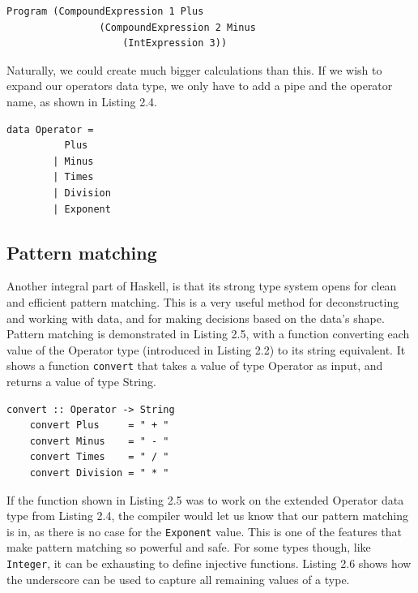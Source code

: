 \begin{lstlisting}[caption={An AST constructed with data types presented in Listing 2.2}, captionpos=b]
    Program (CompoundExpression 1 Plus
                (CompoundExpression 2 Minus
                    (IntExpression 3))
\end{lstlisting}

Naturally, we could create much bigger calculations than this. If we wish to expand our operators data type, we only have to add a pipe and the operator name, as shown in Listing 2.4. \hfill \\

\begin{lstlisting}[caption={An extended version of the Operator data type presented in Listing 2.2}, captionpos=b]
    data Operator =
          Plus
        | Minus
        | Times
        | Division
        | Exponent
\end{lstlisting}

\subsection{Pattern matching}

Another integral part of Haskell, is that its strong type system opens for clean and efficient pattern matching. This is a very useful method for deconstructing and working with data, and for making decisions based on the data's shape. \hfill \\

Pattern matching is demonstrated in Listing 2.5, with a function converting each value of the Operator type (introduced in Listing 2.2) to its string equivalent. It shows a function \texttt{convert} that takes a value of type Operator as input, and returns a value of type String. \hfill \\

\begin{lstlisting}[caption={Haskell function converting values of one type to another}, captionpos=b]
    convert :: Operator -> String
    convert Plus     = " + "
    convert Minus    = " - "
    convert Times    = " / "
    convert Division = " * "
\end{lstlisting}

If the function shown in Listing 2.5 was to work on the extended Operator data type from Listing 2.4, the compiler would let us know that our pattern matching is in, as there is no case for the \texttt{Exponent} value. This is one of the features that make pattern matching so powerful and safe. For some types though, like \texttt{Integer}, it can be exhausting to define injective functions. Listing 2.6 shows how the underscore can be used to capture all remaining values of a type. \hfill \\

